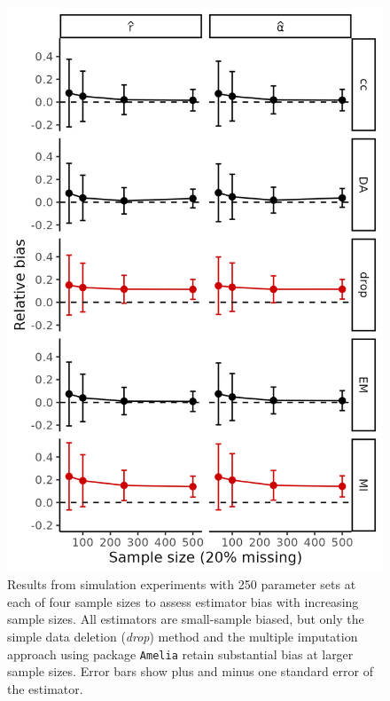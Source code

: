 \documentclass{article}
\begin{document}
\clearpage

\begin{figure}
    \centering
    \includegraphics[width=0.75\linewidth]{Figures/bias_checks_ricker.png}
    \caption{Results from simulation experiments with 250 parameter sets at each of four sample sizes to assess estimator bias with increasing sample sizes. All estimators are small-sample biased, but only the simple data deletion (\textit{drop}) method and the multiple imputation approach using package \texttt{Amelia} retain substantial bias at larger sample sizes. Error bars show plus and minus one standard error of the estimator.}
    \label{fig:bias-checks}
\end{figure}

\end{document}
